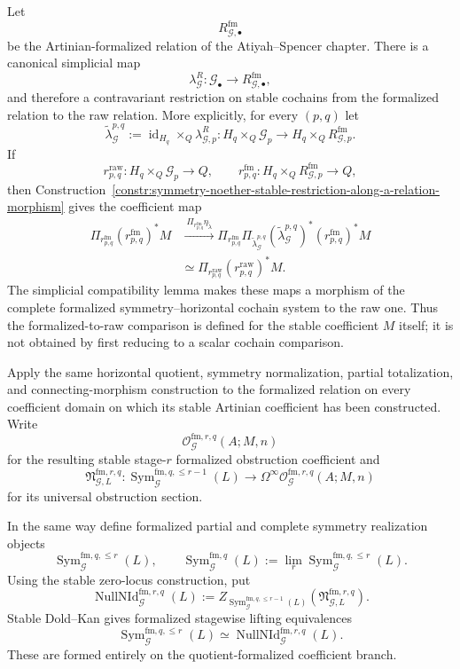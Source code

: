 Let
\[
R_{\mathcal G,\bullet}^{\mathrm{fm}}
\]
be the Artinian-formalized relation of the Atiyah--Spencer chapter.  There is a
canonical simplicial map
\[
\lambda_{\mathcal G}^R:
\mathcal G_\bullet
\longrightarrow
R_{\mathcal G,\bullet}^{\mathrm{fm}},
\]
and therefore a contravariant restriction on stable cochains from the formalized
relation to the raw relation.  More explicitly, for every $(p,q)$ let
\[
\widetilde\lambda_{\mathcal G}^{p,q}
:=
\operatorname{id}_{H_q}\times_Q\lambda_{\mathcal G,p}^R
:
H_q\times_Q\mathcal G_p
\longrightarrow
H_q\times_QR_{\mathcal G,p}^{\mathrm{fm}}.
\]
If
\[
r_{p,q}^{\mathrm{raw}}:
H_q\times_Q\mathcal G_p\to Q,
\qquad
r_{p,q}^{\mathrm{fm}}:
H_q\times_QR_{\mathcal G,p}^{\mathrm{fm}}\to Q,
\]
then Construction~\ref{constr:symmetry-noether-stable-restriction-along-a-relation-morphism}
gives the coefficient map
\[
\begin{aligned}
\Pi_{r_{p,q}^{\mathrm{fm}}}
(r_{p,q}^{\mathrm{fm}})^*M
&\xrightarrow{\ \Pi_{r_{p,q}^{\mathrm{fm}}}\eta_{\widetilde\lambda}\ }
\Pi_{r_{p,q}^{\mathrm{fm}}}
\Pi_{\widetilde\lambda_{\mathcal G}^{p,q}}
(\widetilde\lambda_{\mathcal G}^{p,q})^*
(r_{p,q}^{\mathrm{fm}})^*M\\
&\simeq
\Pi_{r_{p,q}^{\mathrm{raw}}}
(r_{p,q}^{\mathrm{raw}})^*M.
\end{aligned}
\]
The simplicial compatibility lemma makes these maps a morphism of the complete
formalized symmetry--horizontal cochain system to the raw one.  Thus the
formalized-to-raw comparison is defined for the stable coefficient $M$ itself; it
is not obtained by first reducing to a scalar cochain comparison.

Apply the same horizontal quotient, symmetry normalization, partial totalization,
and connecting-morphism construction to the formalized relation on every
coefficient domain on which its stable Artinian coefficient has been constructed.
Write
\[
\mathcal O_{\mathcal G}^{\mathrm{fm},r,q}(A;M,n)
\]
for the resulting stable stage-$r$ formalized obstruction coefficient and
\[
\mathfrak N_{\mathcal G,L}^{\mathrm{fm},r,q}:
\operatorname{Sym}_{\mathcal G}^{\mathrm{fm},q,\le r-1}(L)
\longrightarrow
\Omega^\infty
\mathcal O_{\mathcal G}^{\mathrm{fm},r,q}(A;M,n)
\]
for its universal obstruction section.

In the same way define formalized partial and complete symmetry realization
objects
\[
\operatorname{Sym}_{\mathcal G}^{\mathrm{fm},q,\le r}(L),
\qquad
\operatorname{Sym}_{\mathcal G}^{\mathrm{fm},q}(L)
:=
\lim_r
\operatorname{Sym}_{\mathcal G}^{\mathrm{fm},q,\le r}(L).
\]
Using the stable zero-locus construction, put
\[
\operatorname{NullNId}_{\mathcal G}^{\mathrm{fm},r,q}(L)
:=
Z_{\operatorname{Sym}_{\mathcal G}^{\mathrm{fm},q,\le r-1}(L)}
\left(\mathfrak N_{\mathcal G,L}^{\mathrm{fm},r,q}\right).
\]
Stable Dold--Kan gives formalized stagewise lifting equivalences
\[
\operatorname{Sym}_{\mathcal G}^{\mathrm{fm},q,\le r}(L)
\simeq
\operatorname{NullNId}_{\mathcal G}^{\mathrm{fm},r,q}(L).
\]
These are formed entirely on the quotient-formalized coefficient branch.

